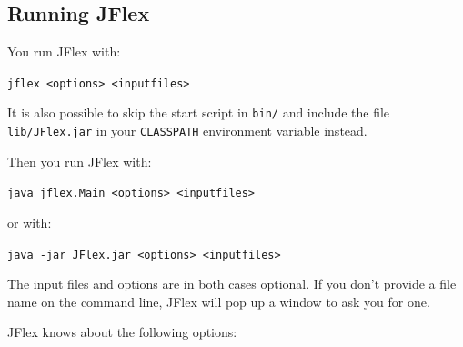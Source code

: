 \documentclass[11pt]{scrartcl}
\begin{document}
\subsection{Running JFlex}
You run JFlex with:

\texttt{jflex <options> <inputfiles>}

It is also possible to skip the start script in \verb+bin/+
and include the file \verb+lib/JFlex.jar+
in your \texttt{CLASSPATH} environment variable instead.

Then you run JFlex with:

\texttt{java jflex.Main <options> <inputfiles>}

or with:

\texttt{java -jar \texttt{JFlex.jar} <options> <inputfiles>}

The input files and options are in both cases optional. If you don't
provide a file name on the command line, JFlex will pop up a window
to ask you for one.

JFlex knows about the following options:
\end{document}
